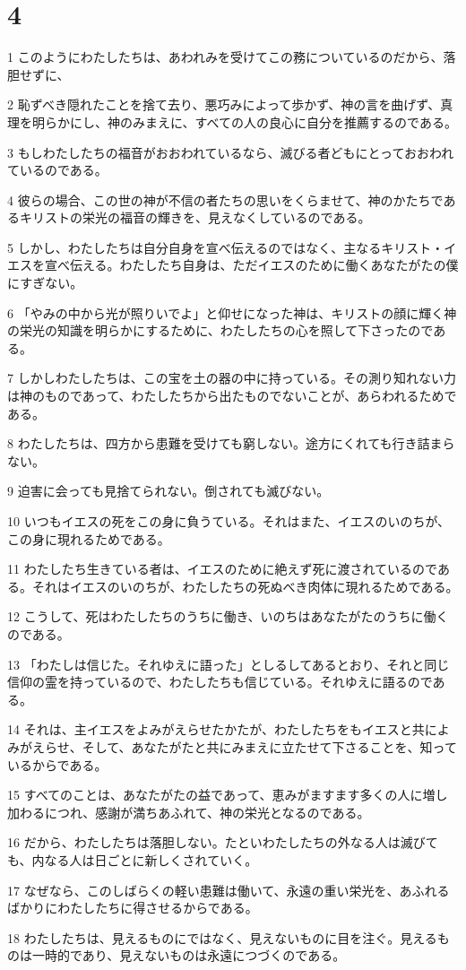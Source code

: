 \chapter{4}

\par 1 このようにわたしたちは、あわれみを受けてこの務についているのだから、落胆せずに、
\par 2 恥ずべき隠れたことを捨て去り、悪巧みによって歩かず、神の言を曲げず、真理を明らかにし、神のみまえに、すべての人の良心に自分を推薦するのである。
\par 3 もしわたしたちの福音がおおわれているなら、滅びる者どもにとっておおわれているのである。
\par 4 彼らの場合、この世の神が不信の者たちの思いをくらませて、神のかたちであるキリストの栄光の福音の輝きを、見えなくしているのである。
\par 5 しかし、わたしたちは自分自身を宣べ伝えるのではなく、主なるキリスト・イエスを宣べ伝える。わたしたち自身は、ただイエスのために働くあなたがたの僕にすぎない。
\par 6 「やみの中から光が照りいでよ」と仰せになった神は、キリストの顔に輝く神の栄光の知識を明らかにするために、わたしたちの心を照して下さったのである。
\par 7 しかしわたしたちは、この宝を土の器の中に持っている。その測り知れない力は神のものであって、わたしたちから出たものでないことが、あらわれるためである。
\par 8 わたしたちは、四方から患難を受けても窮しない。途方にくれても行き詰まらない。
\par 9 迫害に会っても見捨てられない。倒されても滅びない。
\par 10 いつもイエスの死をこの身に負うている。それはまた、イエスのいのちが、この身に現れるためである。
\par 11 わたしたち生きている者は、イエスのために絶えず死に渡されているのである。それはイエスのいのちが、わたしたちの死ぬべき肉体に現れるためである。
\par 12 こうして、死はわたしたちのうちに働き、いのちはあなたがたのうちに働くのである。
\par 13 「わたしは信じた。それゆえに語った」としるしてあるとおり、それと同じ信仰の霊を持っているので、わたしたちも信じている。それゆえに語るのである。
\par 14 それは、主イエスをよみがえらせたかたが、わたしたちをもイエスと共によみがえらせ、そして、あなたがたと共にみまえに立たせて下さることを、知っているからである。
\par 15 すべてのことは、あなたがたの益であって、恵みがますます多くの人に増し加わるにつれ、感謝が満ちあふれて、神の栄光となるのである。
\par 16 だから、わたしたちは落胆しない。たといわたしたちの外なる人は滅びても、内なる人は日ごとに新しくされていく。
\par 17 なぜなら、このしばらくの軽い患難は働いて、永遠の重い栄光を、あふれるばかりにわたしたちに得させるからである。
\par 18 わたしたちは、見えるものにではなく、見えないものに目を注ぐ。見えるものは一時的であり、見えないものは永遠につづくのである。

